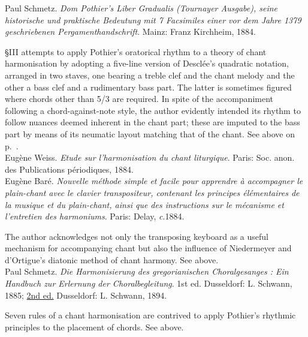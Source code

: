     \parindent=0pt
    \hangindent=0pt
  Paul Schmetz. \emph{Dom Pothier's Liber Gradualis (Tournayer Ausgabe), seine historische und praktische Bedeutung mit 7 Facsimiles einer vor dem Jahre 1379 geschriebenen Pergamenthandschrift}. Mainz:  Franz Kirchheim, 1884.

     \parindent=20pt
     \hangindent=20pt
     \S{}III attempts to apply Pothier's oratorical rhythm to a theory of chant harmonisation by adopting a five-line version of Desclée's quadratic notation, arranged in two staves, one bearing a treble clef and the chant melody and the other a bass clef and a rudimentary bass part. The latter is sometimes figured where chords other than 5/3 are required. In spite of the accompaniment following a chord-against-note style, the author evidently intended its rhythm to follow nuances deemed inherent in the chant part; these are imputed to the bass part by means of its neumatic layout matching that of the chant. See above on p.~\pageref{hl:schmetz_1884}.\\

    \parindent=0pt
    \hangindent=0pt
  \covid{}Eugène Weiss. \emph{Etude sur l'harmonisation du chant liturgique}. Paris:  Soc. anon. des Publications périodiques, 1884. \\

    \parindent=0pt
    \hangindent=0pt
  Eugène Baré. \emph{Nouvelle méthode simple et facile pour apprendre à accompagner le plain-chant avec le clavier transpositeur, contenant les principes élémentaires de la musique et du plain-chant, ainsi que des instructions sur le mécanisme et l'entretien des harmoniums}. Paris:  Delay, \emph{c}.1884.

     \parindent=20pt
     \hangindent=20pt
     The author acknowledges not only the transposing keyboard as a useful mechanism for accompanying chant but also the influence of Niedermeyer and d'Ortigue's diatonic method of chant harmony. See  above.\\

    \parindent=0pt
    \hangindent=0pt
  Paul Schmetz. \emph{Die Harmonisierung des gregorianischen Choralgesanges : Ein Handbuch zur Erlernung der Choralbegleitung}. 1st ed. Dusseldorf:  L. Schwann, 1885;  \underline{2nd ed.} Dusseldorf:  L. Schwann, 1894.

     \parindent=20pt
     \hangindent=20pt
     Seven rules of a chant harmonisation are contrived to apply Pothier's rhythmic principles to the placement of chords. See  above.\\

